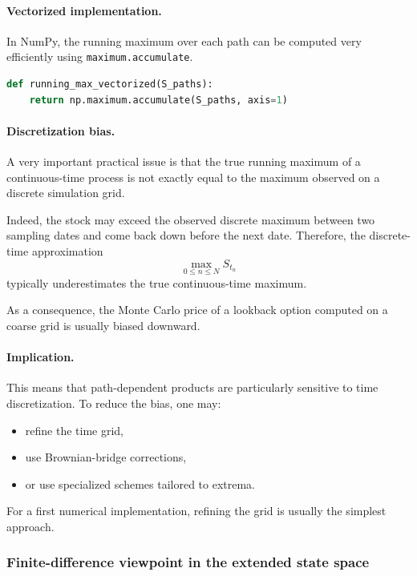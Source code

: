 \documentclass[11pt]{article}
\theoremstyle{plain}
\theoremstyle{definition}
\theoremstyle{remark}
\begin{document}
\paragraph{Vectorized implementation.}
In NumPy, the running maximum over each path can be computed very
efficiently using \texttt{maximum.accumulate}.

\begin{lstlisting}[language=Python]
def running_max_vectorized(S_paths):
    return np.maximum.accumulate(S_paths, axis=1)
\end{lstlisting}

\paragraph{Discretization bias.}
A very important practical issue is that the true running maximum of a
continuous-time process is not exactly equal to the maximum observed on
a discrete simulation grid.

Indeed, the stock may exceed the observed discrete maximum between two
sampling dates and come back down before the next date.
Therefore, the discrete-time approximation
\[
\max_{0\le n\le N}S_{t_n}
\]
typically underestimates the true continuous-time maximum.

As a consequence, the Monte Carlo price of a lookback option computed on
a coarse grid is usually biased downward.

\paragraph{Implication.}
This means that path-dependent products are particularly sensitive to
time discretization.
To reduce the bias, one may:
\begin{itemize}[leftmargin=1.4em]
    \item refine the time grid,
    \item use Brownian-bridge corrections,
    \item or use specialized schemes tailored to extrema.
\end{itemize}

For a first numerical implementation, refining the grid is usually the
simplest approach.

\subsubsection{Finite-difference viewpoint in the extended state space}
\end{document}

